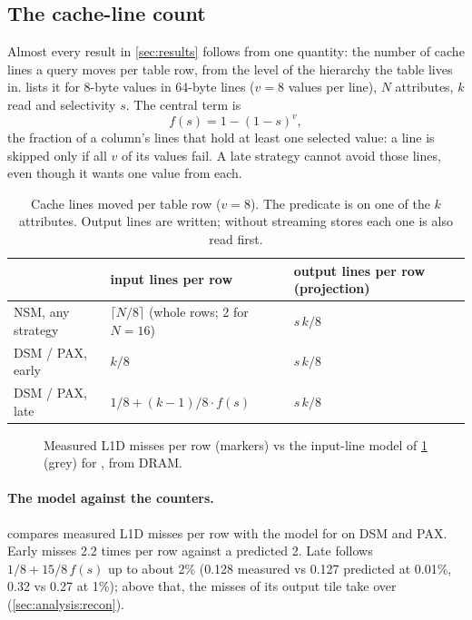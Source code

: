 
\subsection{The cache-line count}
\label{sec:analysis:lines}

Almost every result in \cref{sec:results} follows from one quantity: the number of cache lines
a query moves per table row, from the level of the hierarchy the table lives in.
 lists it for 8-byte values in 64-byte lines ($v = 8$ values per line), $N$
attributes, $k$ read and selectivity $s$. The central term is
\[
  f(s) = 1 - (1-s)^{v},
\]
the fraction of a column's lines that hold at least one selected value: a line is skipped
only if all $v$ of its values fail. A late strategy cannot avoid those lines, even though it
wants one value from each.

\begin{table}[t]
\centering\small
\caption{Cache lines moved per table row ($v{=}8$). The predicate is on one of the $k$
attributes. Output lines are written; without streaming stores each one is also read first.}
\label{tab:linemodel}
\begin{tabular}{lll}
\toprule
 & input lines per row & output lines per row (projection) \\
\midrule
NSM, any strategy & $\lceil N/8 \rceil$ (whole rows; 2 for $N{=}16$) & $s\,k/8$ \\
DSM / PAX, early & $k/8$ & $s\,k/8$ \\
DSM / PAX, late & $1/8 + (k-1)/8 \cdot f(s)$ & $s\,k/8$ \\
\bottomrule
\end{tabular}
\end{table}

\begin{figure}[t]
\centering
{}
\caption{Measured L1D misses per row (markers) vs the input-line model of
\cref{tab:linemodel} (grey) for , from DRAM.}
\label{fig:sellines}
\end{figure}

\paragraph{The model against the counters.}  compares measured L1D misses
per row with the model for  on DSM and PAX. Early misses 2.2 times per row
against a predicted 2. Late follows $1/8 + 15/8\,f(s)$ up to about 2\% (0.128 measured vs
0.127 predicted at 0.01\%, 0.32 vs 0.27 at 1\%); above that, the misses of its output tile
take over (\cref{sec:analysis:recon}).


